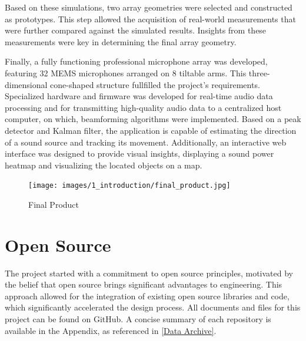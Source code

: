 Based on these simulations, two array geometries were selected and constructed as prototypes.
This step allowed the acquisition of real-world measurements that were further compared against the simulated results.
Insights from these measurements were key in determining the final array geometry.

Finally, a fully functioning professional microphone array was developed, featuring 32 MEMS microphones arranged on 8 tiltable arms.
This three-dimensional cone-shaped structure fullfilled the project's requirements.
Specialized hardware and firmware was developed for real-time audio data processing and for transmitting high-quality audio data to a centralized host computer,
on which, beamforming algorithms were implemented.
Based on a peak detector and Kalman filter, the application is capable of estimating the direction of a sound source and tracking its movement.
Additionally, an interactive web interface was designed to provide visual insights, displaying a sound power heatmap and visualizing the located objects on a map.
\begin{figure}[h!]
	\centering
	\texttt{[image: images/1\_introduction/final\_product.jpg]}
	\caption{Final Product}
	\label{fig:final_product}
\end{figure}

\section{Open Source}
The project started with a commitment to open source principles, motivated by the belief that open source brings significant advantages to engineering.
This approach allowed for the integration of existing open source libraries and code, which significantly accelerated the design process.
All documents and files for this project can be found on GitHub.
A concise summary of each repository is available in the Appendix, as referenced in \ref{Data Archive}.
